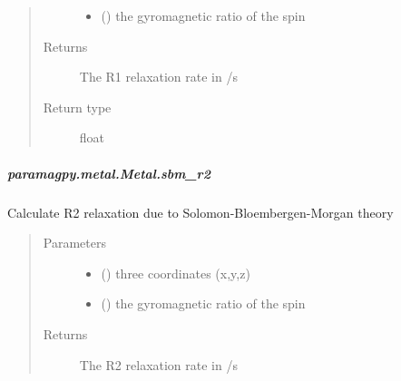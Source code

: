 \documentclass[a4paper,10pt,english,openany,oneside]{sphinxmanual}
\begin{document}
\begin{fulllineitems}
\begin{fulllineitems}
\begin{fulllineitems}
\begin{quote}
\begin{description}
\begin{itemize}
\item {} 
 () \textendash{} the gyromagnetic ratio of the spin

\end{itemize}

\item[{Returns}] \leavevmode
{} \textendash{} The R1 relaxation rate in /s

\item[{Return type}] \leavevmode
float

\end{description}\end{quote}

\end{fulllineitems}



\subparagraph{paramagpy.metal.Metal.sbm\_r2}
\label{\detokenize{reference/generated/paramagpy.metal.Metal.sbm_r2:paramagpy-metal-metal-sbm-r2}}\label{\detokenize{reference/generated/paramagpy.metal.Metal.sbm_r2::doc}}

\begin{fulllineitems}
\label{\detokenize{reference/generated/paramagpy.metal.Metal.sbm_r2:paramagpy.metal.Metal.sbm_r2}}
Calculate R2 relaxation due to Solomon-Bloembergen-Morgan theory
\begin{quote}\begin{description}
\item[{Parameters}] \leavevmode\begin{itemize}
\item {} 
 () \textendash{} three coordinates (x,y,z)

\item {} 
 () \textendash{} the gyromagnetic ratio of the spin

\end{itemize}

\item[{Returns}] \leavevmode
{} \textendash{} The R2 relaxation rate in /s


\end{description}
\end{quote}
\end{fulllineitems}
\end{fulllineitems}
\end{fulllineitems}
\end{document}
